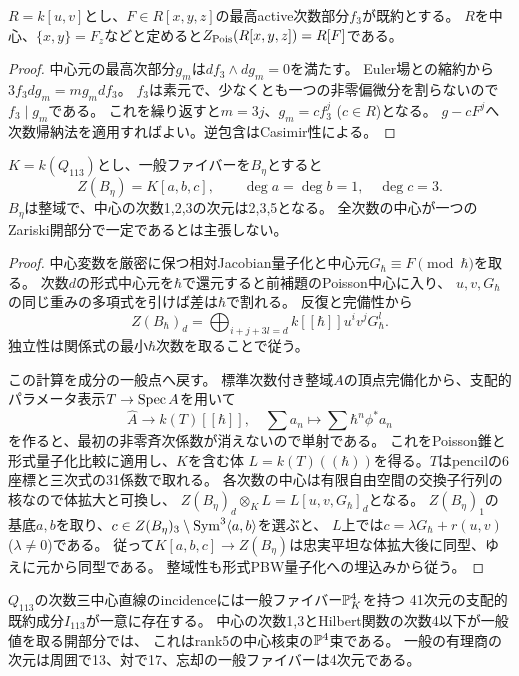 \begin{lemma}[相対Jacobian括弧の全Poisson中心]
$R=k[u,v]$とし、$F\in R[x,y,z]$の最高active次数部分$f_3$が既約とする。
$R$を中心、$\{x,y\}=F_z$などと定めると$Z_{\rm Pois}(R[x,y,z])=R[F]$である。
\end{lemma}
\begin{proof}
中心元の最高次部分$g_m$は$df_3\wedge dg_m=0$を満たす。
Euler場との縮約から$3f_3dg_m=mg_mdf_3$。
$f_3$は素元で、少なくとも一つの非零偏微分を割らないので$f_3\mid g_m$である。
これを繰り返すと$m=3j$、$g_m=cf_3^j$ ($c\in R$)となる。
$g-cF^j$へ次数帰納法を適用すればよい。逆包含はCasimir性による。
\end{proof}
\begin{theorem}[量子成分の関数体上の中心]
\label{thm:pair-generic-center}
$K=k(Q_{113})$とし、一般ファイバーを$B_\eta$とすると
\[
 Z(B_\eta)=K[a,b,c],\qquad\deg a=\deg b=1,\quad\deg c=3.
\]
$B_\eta$は整域で、中心の次数1,2,3の次元は2,3,5となる。
全次数の中心が一つのZariski開部分で一定であるとは主張しない。
\end{theorem}
\begin{proof}
中心変数を厳密に保つ相対Jacobian量子化と中心元$G_\hbar\equiv F\pmod\hbar$を取る。
次数$d$の形式中心元を$\hbar$で還元すると前補題のPoisson中心に入り、
$u,v,G_\hbar$の同じ重みの多項式を引けば差は$\hbar$で割れる。
反復と完備性から
\[
 Z(B_\hbar)_d=\bigoplus_{i+j+3l=d}k[[\hbar]]u^iv^jG_\hbar^l.
\]
独立性は関係式の最小$\hbar$次数を取ることで従う。

この計算を成分の一般点へ戻す。
標準次数付き整域$A$の頂点完備化から、支配的パラメータ表示$T\to\operatorname{Spec} A$を用いて
\[
 \widehat A\longrightarrow k(T)[[\hbar]],\quad
 \sum a_n\longmapsto\sum\hbar^n\phi^*a_n
\]
を作ると、最初の非零斉次係数が消えないので単射である。
これをPoisson錐と形式量子化比較に適用し、$K$を含む体
$L=k(T)((\hbar))$を得る。$T$はpencilの6座標と三次式の31係数で取れる。
各次数の中心は有限自由空間の交換子行列の核なので体拡大と可換し、
$Z(B_\eta)_d\otimes_K L=L[u,v,G_\hbar]_d$となる。
$Z(B_\eta)_1$の基底$a,b$を取り、$c\in Z(B_\eta)_3\setminus\operatorname{Sym}^3\langle a,b\rangle$を選ぶと、
$L$上では$c=\lambda G_\hbar+r(u,v)$ ($\lambda\ne0$)である。
従って$K[a,b,c]\to Z(B_\eta)$は忠実平坦な体拡大後に同型、ゆえに元から同型である。
整域性も形式PBW量子化への埋込みから従う。
\end{proof}
\begin{corollary}[支配的incidenceと有限次数の良い開部分]
\label{cor:central-incidence-rational-dimensions}
$Q_{113}$の次数三中心直線のincidenceには一般ファイバー$\mathbb P^4_K$を持つ
41次元の支配的既約成分$I_{113}$が一意に存在する。
中心の次数1,3とHilbert関数の次数4以下が一般値を取る開部分では、
これはrank5の中心核束の$\mathbb P^4$束である。
一般の有理商の次元は周囲で13、対で17、忘却の一般ファイバーは4次元である。
\end{corollary}
